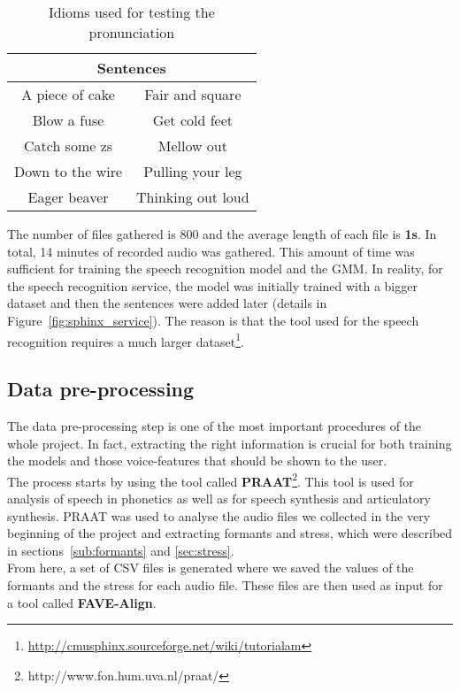 \begin{table}[!ht]
	\centering
	\begin{tabular}{|c|c|}
		\hline
		\multicolumn{2}{|c|}{Sentences}      \\ \hline
		A piece of cake  & Fair and square   \\ \hline
		Blow a fuse      & Get cold feet     \\ \hline
		Catch some zs    & Mellow out        \\ \hline
		Down to the wire & Pulling your leg  \\ \hline
		Eager beaver     & Thinking out loud \\ \hline
	\end{tabular}
	\caption{Idioms used for testing the pronunciation}
	\label{table:sentences}
\end{table}

\noindent The number of files gathered is 800 and the average length of each file is \textbf{1s}. In total, 14 minutes of recorded audio was gathered. This amount of time was sufficient for training the speech recognition model and the GMM. In reality, for the speech recognition service, the model was initially trained with a bigger dataset and then the sentences were added later (details in Figure~\ref{fig:sphinx_service}). The reason is that the tool used for the speech recognition requires a much larger dataset\footnote{\url{http://cmusphinx.sourceforge.net/wiki/tutorialam}}.

\subsection{Data pre-processing}
\label{ssec:pre_processing}

The data pre-processing step is one of the most important procedures of the whole project. In fact, extracting the right information is crucial for both training the models and those voice-features that should be shown to the user. \\

\noindent The process starts by using the tool called \textbf{PRAAT}\footnote{http://www.fon.hum.uva.nl/praat/}. This tool is used for analysis of speech in phonetics as well as for speech synthesis and articulatory synthesis\cite{boersma2001praat}. PRAAT was used to analyse the audio files we collected in the very beginning of the project and extracting formants and stress, which were described in sections~\ref{sub:formants} and \ref{sec:stress}. \\
From here, a set of CSV files is generated where we saved the values of the formants and the stress for each audio file. These files are then used as input for a tool called \textbf{FAVE-Align}\cite{yuan2008speaker}. \\

